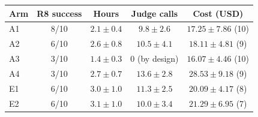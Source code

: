 \begin{tabular}{lcccc}
\toprule
Arm & R8 success & Hours & Judge calls & Cost (USD) \\
\midrule
A1 & 8/10 & $2.1 \pm 0.4$ & $9.8 \pm 2.6$ & $17.25 \pm 7.86$ (10) \\
A2 & 6/10 & $2.6 \pm 0.8$ & $10.5 \pm 4.1$ & $18.11 \pm 4.81$ (9) \\
A3 & 3/10 & $1.4 \pm 0.3$ & 0 (by design) & $16.07 \pm 4.46$ (10) \\
A4 & 3/10 & $2.7 \pm 0.7$ & $13.6 \pm 2.8$ & $28.53 \pm 9.18$ (9) \\
\midrule
E1 & 6/10 & $3.0 \pm 1.0$ & $11.3 \pm 2.5$ & $20.09 \pm 4.17$ (8) \\
E2 & 6/10 & $3.1 \pm 1.0$ & $10.0 \pm 3.4$ & $21.29 \pm 6.95$ (7) \\
\bottomrule
\end{tabular}
